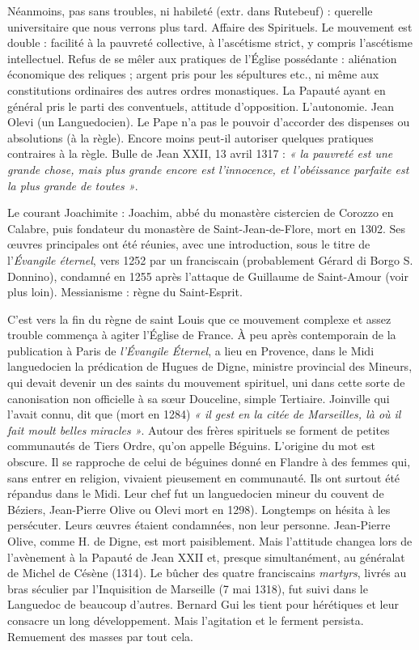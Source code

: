 \documentclass[french,twoside]{book} %
\def\bignobreak{\ifdim\lastskip<\bigskipamount
  \removelastskip\nopagebreak\bigskip\fi}
\newcommand{\labelblock}[1]{\bigbreak{\color{rubric}\noindent\textbf{#1}\par}\bignobreak}
\begin{document}
\labelblock{Les Tiers Ordres.}

\noindent Néanmoins, pas sans troubles, ni habileté (extr. dans Rutebeuf) : querelle universitaire que nous verrons plus tard. Affaire des Spirituels. Le mouvement est double : facilité à la pauvreté collective, à l’ascétisme strict, y compris l’ascétisme intellectuel. Refus de se mêler aux pratiques de l’Église possédante : aliénation  
\label{p112} économique des reliques ; argent pris pour les sépultures etc., ni même aux constitutions ordinaires des autres ordres monastiques. La Papauté ayant en général pris le parti des conventuels, attitude d’opposition. L’autonomie. Jean Olevi (un Languedocien). Le Pape n’a pas le pouvoir d’accorder des dispenses ou absolutions (à la règle). Encore moins peut-il autoriser quelques pratiques contraires à la règle. Bulle de Jean XXII, 13 avril 1317 : \emph{« la pauvreté est une grande chose, mais plus grande encore est l’innocence, et l’obéissance parfaite est la plus grande de toutes »}.\par
Le courant Joachimite : Joachim, abbé du monastère cistercien de Corozzo en Calabre, puis fondateur du monastère de Saint-Jean-de-Flore, mort en 1302. Ses œuvres principales ont été réunies, avec une introduction, sous le titre de l’{\itshape Évangile éternel}, vers 1252 par un franciscain (probablement Gérard di Borgo S. Donnino), condamné en 1255 après l’attaque de Guillaume de Saint-Amour (voir plus loin). Messianisme : règne du Saint-Esprit.\par
C’est vers la fin du règne de saint Louis que ce mouvement complexe et assez trouble commença à agiter l’Église de France. À peu après contemporain de la publication à Paris de \emph{l’Évangile Éternel}, a lieu en Provence, dans le Midi languedocien la prédication de Hugues de Digne, ministre provincial des Mineurs, qui devait devenir un des saints du mouvement spirituel, uni dans cette sorte de canonisation non officielle à sa sœur Douceline, simple Tertiaire. Joinville qui l’avait connu, dit que (mort en 1284) \emph{« il gest en la citée de Marseilles, là où il fait moult belles miracles »}. Autour des frères spirituels se forment de petites communautés de Tiers Ordre, qu’on appelle Béguins. L’origine du mot est obscure. Il se rapproche de celui de béguines donné en Flandre à des femmes qui, sans entrer en religion, vivaient pieusement en communauté. Ils ont surtout été répandus dans le Midi. Leur chef fut un languedocien mineur du couvent de Béziers, Jean-Pierre Olive ou Olevi mort en 1298). Longtemps on hésita à les persécuter. Leurs œuvres étaient condamnées, non leur personne. Jean-Pierre Olive, comme H. de Digne, est mort paisiblement. Mais l’attitude changea lors de l’avènement à la Papauté de Jean XXII et, presque simultanément, au généralat de Michel de Césène (1314). Le bûcher des quatre franciscains \emph{martyrs}, livrés au bras séculier par l’Inquisition de Marseille (7 mai 1318), fut suivi dans le Languedoc de beaucoup d’autres. Bernard Gui les tient pour hérétiques et leur consacre un long développement. Mais l’agitation et le ferment persista. Remuement des masses par tout cela.
\end{document}
